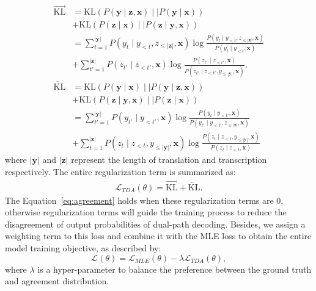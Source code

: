 \documentclass[letterpaper]{article} %
\begin{document}
\begin{equation}
    \begin{aligned}
        \overrightarrow{\text{KL}} & = \text{KL} \left( P\left( \mathbf{y} \mid \mathbf{z}, \mathbf{x} \right) \mid\mid P\left( \mathbf{y} \mid \mathbf{x} \right) \right) \\
        & + \text{KL} \left(P\left( \mathbf{z} \mid \mathbf{x} \right) \mid\mid P\left( \mathbf{z} \mid \mathbf{y}, \mathbf{x} \right) \right)\\
        & = \sum_{t=1}^{|\mathbf{y}|}  P\left(y_{t} \mid y_{<t},z_{\leq|\mathbf{z}|}, \mathbf{x} \right) \log \frac{P\left(y_{t} \mid y_{<t},z_{\leq|\mathbf{z}|}, \mathbf{x} \right)}{P\left(y_{t} \mid y_{<t}, \mathbf{x} \right)} \\
        & + \sum_{t'=1}^{|\mathbf{z}|}  P\left(z_{t'} \mid z_{<t'}, \mathbf{x} \right) \log \frac{P\left(z_{t'} \mid z_{<t'}, \mathbf{x} \right)}{P\left(z_{t'} \mid z_{<t'},y_{\leq|\mathbf{y}|}, \mathbf{x} \right)}, \\
        \overleftarrow{\text{KL}} & =   \text{KL} \left( P\left( \mathbf{y} \mid \mathbf{x} \right) \mid\mid P\left( \mathbf{y} \mid \mathbf{z}, \mathbf{x} \right) \right) \\
        & + \text{KL} \left( P\left( \mathbf{z} \mid \mathbf{y}, \mathbf{x} \right) \mid\mid P\left( \mathbf{z} \mid \mathbf{x} \right) \right) \\
        & = \sum_{t'=1}^{|\mathbf{y}|}  P\left(y_{t'} \mid y_{<t'}, \mathbf{x} \right) \log \frac{P\left(y_{t} \mid y_{<t'}, \mathbf{x} \right)}{P\left(y_{t'} \mid y_{<t'},z_{\leq|\mathbf{z}|}, \mathbf{x} \right)} \\
        & + \sum_{t=1}^{|\mathbf{z}|}  P\left(z_{t} \mid z_{<t},y_{\leq|\mathbf{y}|}, \mathbf{x} \right) \log \frac{P\left(z_{t} \mid z_{<t},y_{\leq|\mathbf{y}|}, \mathbf{x} \right)}{P\left(z_{t} \mid z_{<t}, \mathbf{x} \right)}
    \end{aligned}
    \label{eq:kl2}
\end{equation}
where $|\mathbf{y}|$ and $|\mathbf{z}|$ represent the length of translation and transcription respectively.
The entire regularization term is summarized as:
\begin{equation}
    \begin{aligned}
        \mathcal{L}_{TDA}(\theta)= \overrightarrow{\text{KL}} +  \overleftarrow{\text{KL}}.
    \end{aligned}
    \label{eq:loss_tda}
\end{equation}
The Equation~\ref{eq:agreement} holds when these regularization terms are $0$, otherwise regularization terms will guide the training process to reduce the disagreement of output probabilities of dual-path decoding.
Besides, we assign a weighting term to this loss and combine it with the MLE loss to obtain the entire model training objective, as described by:
\begin{equation}
    \mathcal{L}_{}(\theta) = \mathcal{L}_{MLE}(\theta) - \lambda \mathcal{L}_{TDA}(\theta),
    \label{eq:loss_overall}
\end{equation}
where $\lambda$ is a hyper-parameter to balance the preference between the ground truth and agreement distribution.
\end{document}
